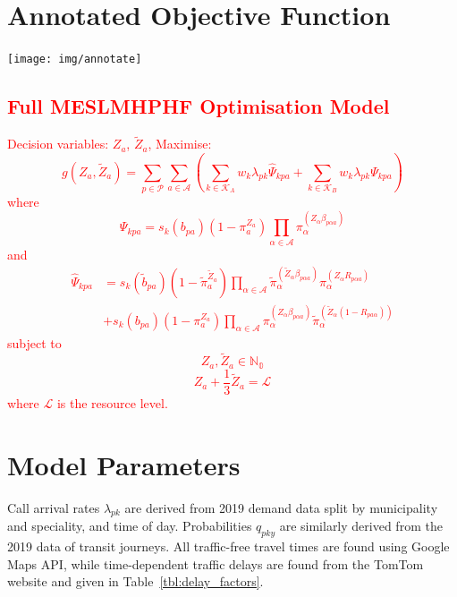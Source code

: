 \documentclass[numbers,webpdf,imaman]{ima-authoring-template}%
\begin{document}
\newpage

\appendix

\section{Annotated Objective Function}\label{apx:annotated}
\texttt{[image: img/annotate]}

\newpage

\textcolor{red}{
\section{Full MESLMHPHF Optimisation Model}\label{apx:fullmodel}
Decision variables: $Z_a$, $\tilde{Z}_a$,
Maximise:
\begin{equation*}
g\left(Z_a, \tilde{Z}_a\right) =
\sum_{p \in \mathcal{P}} \sum_{a \in \mathcal{A}}
\left( \sum_{k \in \mathcal{K}_A}  w_k \lambda_{pk} \hat{\Psi}_{kpa} +
\sum_{k \in \mathcal{K}_B}  w_k \lambda_{pk} \Psi_{kpa} \right)
\end{equation*}
where
\begin{equation*}
\Psi_{kpa} = s_k\left( b_{pa} \right)
\left(1 - \pi_{a}^{Z_a} \right)
\prod_{\alpha \in \mathcal{A}}
\pi_{\alpha}^{\left(Z_{\alpha} \beta_{p\alpha a} \right)}
\end{equation*}
and
\begin{align*}
\hat{\Psi}_{kpa} &= s_k\left(\tilde{b}_{pa}\right)
\left(1 - \tilde{\pi}_{a}^{\tilde{Z}_a} \right)
\prod_{\alpha \in \mathcal{A}}
\tilde{\pi}_{\alpha}^{\left(\tilde{Z}_{\alpha} \beta_{p\alpha a}\right)}
\pi_{\alpha}^{\left(Z_{\alpha} R_{p \alpha a}\right) } \nonumber \\
&+ s_k\left(b_{pa}\right) \left(1 - \pi_{a}^{Z_a} \right)
\prod_{\alpha \in \mathcal{A}}
\pi_{\alpha}^{\left(Z_{\alpha}\beta_{p\alpha a}\right)}
\tilde{\pi}_{\alpha}^{\left(\tilde{Z}_{\alpha}
\left(1 - R _{p a\alpha}\right)\right)}
\end{align*}
subject to
\begin{equation*}
Z_a, \tilde{Z}_a \in \mathbb{N_0}
\end{equation*}
\begin{equation*}
Z_a + \frac{1}{3} \tilde{Z}_a = \mathcal{L}
\end{equation*}
where $\mathcal{L}$ is the resource level.
}

\section{Model Parameters}\label{apx:parameters}
Call arrival rates $\lambda_{pk}$ are derived from 2019 demand data split by
municipality and speciality, and time of day. Probabilities $q_{pky}$ are
similarly derived from the 2019 data of transit journeys. All traffic-free
travel times are found using Google Maps API, while time-dependent traffic
delays are found from the TomTom website and given in
Table~\ref{tbl:delay_factors}.
\end{document}
